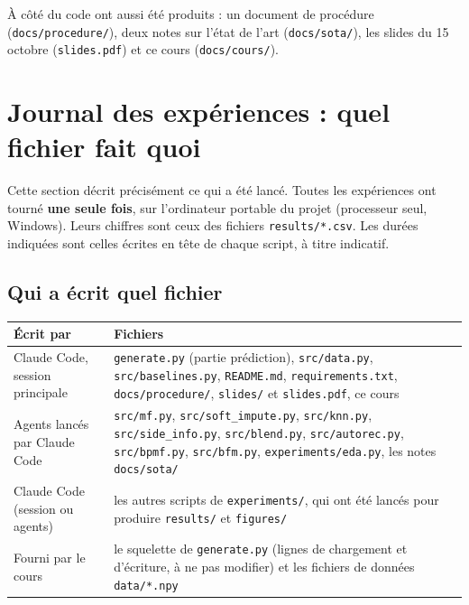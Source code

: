 \documentclass[11pt,a4paper]{article}
\begin{document}
À côté du code ont aussi été produits : un document de procédure (\texttt{docs/procedure/}),
deux notes sur l'état de l'art (\texttt{docs/sota/}), les slides du 15 octobre
(\texttt{slides.pdf}) et ce cours (\texttt{docs/cours/}).

\section{Journal des expériences : quel fichier fait quoi}\label{sec:journal}

Cette section décrit précisément ce qui a été lancé. Toutes les expériences ont tourné
\textbf{une seule fois}, sur l'ordinateur portable du projet (processeur seul, Windows).
Leurs chiffres sont ceux des fichiers \texttt{results/*.csv}. Les durées indiquées sont
celles écrites en tête de chaque script, à titre indicatif.

\subsection{Qui a écrit quel fichier}

\begin{center}
\small
\begin{tabularx}{\linewidth}{@{}lX@{}}
\toprule
\textbf{Écrit par} & \textbf{Fichiers} \\
\midrule
Claude Code, session principale & \texttt{generate.py} (partie prédiction), \texttt{src/data.py},
  \texttt{src/baselines.py}, \texttt{README.md}, \texttt{requirements.txt},
  \texttt{docs/procedure/}, \texttt{slides/} et \texttt{slides.pdf}, ce cours \\
Agents lancés par Claude Code & \texttt{src/mf.py}, \texttt{src/soft\_impute.py},
  \texttt{src/knn.py}, \texttt{src/side\_info.py}, \texttt{src/blend.py},
  \texttt{src/autorec.py}, \texttt{src/bpmf.py}, \texttt{src/bfm.py},
  \texttt{experiments/eda.py}, les notes \texttt{docs/sota/} \\
Claude Code (session ou agents) & les autres scripts de \texttt{experiments/}, qui ont
  été lancés pour produire \texttt{results/} et \texttt{figures/} \\
Fourni par le cours & le squelette de \texttt{generate.py} (lignes de chargement et
  d'écriture, à ne pas modifier) et les fichiers de données \texttt{data/*.npy} \\
\bottomrule
\end{tabularx}
\end{center}
\end{document}
